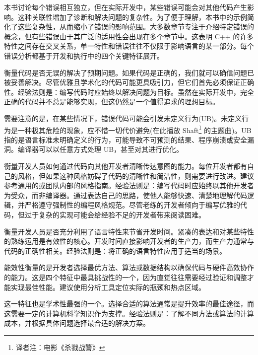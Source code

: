 
本书讨论每个错误相互独立，但在实际开发中，某些错误可能会对其他代码产生影响。这种关联性增加了诊断和解决问题的复杂性。为了便于理解，本书中的示例简化了这些复杂性，从而缩小了错误的影响范围。大多数章节专注于介绍特定错误的概念，但有些错误由于其广泛的适用性会出现在多个章节中。这表明 C++ 的许多特性之间存在交叉关系，单一特性和错误往往不仅限于影响语言的某一部分。每个错误分析都基于开发和执行中的四个关键特征展开。


衡量代码是否无误的解决了预期问题。如果代码是正确的，我们就可以确信问题已被妥善解决。尽管优雅且学术化的代码可能更具吸引力，但它们首先必须保证正确性。经验法则是：编写代码时应始终以解决问题为目标。虽然在实际开发中，完全正确的代码并不总是能够实现，但这仍然是一个值得追求的理想目标。

需要注意的是，在某些情况下，错误代码可能会引发未定义行为(UB)。未定义行为是一种极其危险的现象，应不惜一切代价避免(在此播放 Shaft\footnote{译者注：电影《杀戮战警》} 的主题曲)。UB 指的是语言标准未明确定义的行为，可能导致不可预测的结果、程序崩溃或安全漏洞。编译器可以以任意方式处理 UB，甚至对其进行优化。


衡量开发人员如何通过代码向其他开发者清晰传达意图的能力。每位开发者都有自己的风格，但如果这种风格妨碍了代码的清晰性和简洁性，则需要进行改进。建议参考通用的或团队内部的风格指南。经验法则是：编写代码时应始终以其他开发者为受众，而非编译器。通过表达自己的思路，使他人能够快速、清楚地理解代码逻辑，并严格遵守强制性的编程风格规范。尽管老练的开发者倾向于编写优雅的代码，但过于复杂的实现可能会给经验不足的开发者带来阅读困难。


衡量开发人员是否充分利用了语言特性来节省开发时间。紧凑的表达和对某些特性的熟练运用是有效性的核心。开发时间直接影响开发者的生产力，而生产力通常与代码的正确性相关。经验法则是：将正确的语言特性应用于适当的场景。


能效性衡量的是开发者选择最优方法、算法或数据结构以确保代码与硬件高效协作的能力。这是四个特征中最具挑战性的一个，因为直觉往往需要经过验证和调整才能实现最佳性能。建议使用分析工具定位实际的瓶颈和热点区域。

这一特征也是学术性最强的一个。选择合适的算法通常是提升效率的最佳途径，而这需要一定的计算机科学知识作为支撑。经验法则是：了解不同方法或算法的计算成本，并根据具体问题选择最合适的解决方案。

